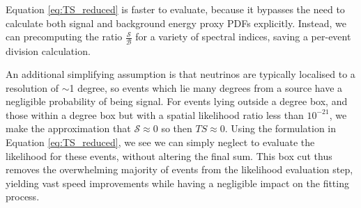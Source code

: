 Equation \ref{eq:TS_reduced}  is faster to evaluate, because it bypasses the need to calculate both signal and background energy proxy PDFs explicitly. Instead, we can precomputing the ratio $\frac{\mathcal{S}}{\mathcal{B}}$ for a variety of spectral indices, saving a per-event division calculation.

An additional simplifying assumption is that neutrinos are typically localised to a resolution of $\sim$1 degree, so events which lie many degrees from a source have a negligible probability of being signal. For events lying outside a  degree box, and those within a  degree box but with a spatial likelihood ratio less than $10^{-21}$, we make the approximation that $\mathcal{S} \approx 0$ so then $TS \approx 0$. Using the formulation in Equation \ref{eq:TS_reduced}, we see we can simply neglect to evaluate the likelihood for these events, without altering the final sum. This box cut thus removes the overwhelming majority of events from the likelihood evaluation step, yielding vast speed improvements while having a negligible impact on the fitting process.

